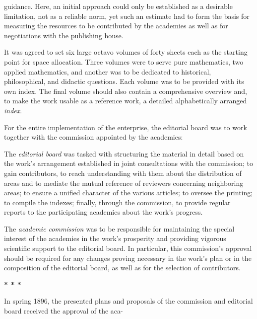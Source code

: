 \thispagestyle{fancy}

\vspace{0.5cm}

guidance. Here, an initial approach could only be established as a desirable limitation, not as a reliable norm, yet such an estimate had to form the basis for measuring the resources to be contributed by the academies as well as for negotiations with the publishing house.

It was agreed to set six large octavo volumes of forty sheets each as the starting point for space allocation. Three volumes were to serve pure mathematics, two applied mathematics, and another was to be dedicated to historical, philosophical, and didactic questions. Each volume was to be provided with its own index. The final volume should also contain a comprehensive overview and, to make the work usable as a reference work, a detailed alphabetically arranged \textit{index}.

For the entire implementation of the enterprise, the editorial board was to work together with the commission appointed by the academies:

The \textit{editorial board} was tasked with structuring the material in detail based on the work's arrangement established in joint consultations with the commission; to gain contributors, to reach understanding with them about the distribution of areas and to mediate the mutual reference of reviewers concerning neighboring areas; to ensure a unified character of the various articles; to oversee the printing; to compile the indexes; finally, through the commission, to provide regular reports to the participating academies about the work's progress.

The \textit{academic commission} was to be responsible for maintaining the special interest of the academies in the work's prosperity and providing vigorous scientific support to the editorial board. In particular, this commission's approval should be required for any changes proving necessary in the work's plan or in the composition of the editorial board, as well as for the selection of contributors.

\vspace{0.5cm}
\centerline{\textbf{* * *}}
\vspace{0.5cm}

In spring 1896, the presented plans and proposals of the commission and editorial board received the approval of the aca-
